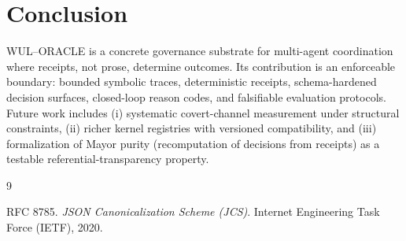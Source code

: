 \documentclass[11pt,a4paper]{article}
\theoremstyle{plain}
\theoremstyle{definition}
\theoremstyle{remark}
\begin{document}
\section{Conclusion}
WUL--ORACLE is a concrete governance substrate for multi-agent coordination where receipts, not prose, determine outcomes. Its contribution is an enforceable boundary: bounded symbolic traces, deterministic receipts, schema-hardened decision surfaces, closed-loop reason codes, and falsifiable evaluation protocols. Future work includes (i) systematic covert-channel measurement under structural constraints, (ii) richer kernel registries with versioned compatibility, and (iii) formalization of Mayor purity (recomputation of decisions from receipts) as a testable referential-transparency property.

\begin{thebibliography}{9}

RFC 8785.
\newblock \emph{JSON Canonicalization Scheme (JCS)}.
\newblock Internet Engineering Task Force (IETF), 2020.

\end{thebibliography}
\end{document}

